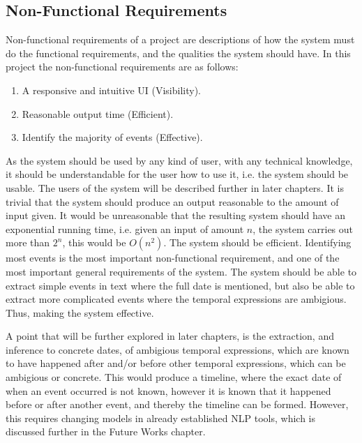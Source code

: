 \subsection{Non-Functional Requirements}
\par Non-functional requirements of a project are descriptions of how the system must do the functional requirements, and the qualities the system should have. In this project the non-functional requirements are as follows:
\begin{enumerate}
\item A responsive and intuitive UI (Visibility).
\item Reasonable output time (Efficient).
\item Identify the majority of events (Effective).
\end{enumerate}
\par As the system should be used by any kind of user, with any technical knowledge, it should be understandable for the user how to use it, i.e. the system should be usable. The users of the system will be described further in later chapters. It is trivial that the system should produce an output reasonable to the amount of input given. It would be unreasonable that the resulting system should have an exponential running time, i.e. given an input of amount $n$, the system carries out more than $2^n$, this would be $O(n^2)$. The system should be efficient. Identifying most events is the most important non-functional requirement, and one of the most important general requirements of the system. The system should be able to extract simple events in text where the full date is mentioned, but also be able to extract more complicated events where the temporal expressions are ambigious. Thus, making the system effective.
\par A point that will be further explored in later chapters, is the extraction, and inference to concrete dates, of ambigious temporal expressions, which are known to have happened after and/or before other temporal expressions, which can be ambigious or concrete. This would produce a timeline, where the exact date of when an event occurred is not known, however it is known that it happened before or after another event, and thereby the timeline can be formed. However, this requires changing models in already established NLP tools, which is discussed further in the Future Works chapter.

